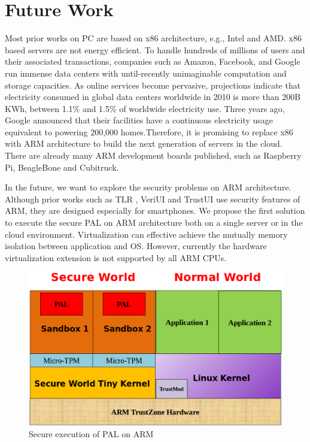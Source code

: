 \section{Future Work}
\label{sec:future}

Most prior works on PC are based on x86 architecture, e.g., Intel and AMD. x86
based servers are not energy efficient. To handle hundreds of millions of users
and their associated transactions, companies such as Amazon, Facebook, and
Google run immense data centers with until-recently unimaginable computation and
storage capacities. As online services become pervasive, projections indicate
that electricity consumed in global data centers worldwide in 2010 is more than
200B KWh, between 1.1\% and 1.5\% of worldwide electricity use. Three years ago,
Google announced that their facilities have a continuous electricity usage
equivalent to powering 200,000 homes.Therefore, it is promising to replace x86
with ARM architecture to build the next generation of servers in the cloud.
There are already many ARM development boards published, such as Raspberry Pi,
BeagleBone and Cubitruck. 

In the future, we want to explore the security problems on ARM architecture.
Although prior works such as TLR \cite{TLR}, VeriUI \cite{VeriUI} and TrustUI
\cite{TrustUI} use security features of ARM, they are designed especially for
smartphones. We propose the first solution to execute the secure PAL on ARM
architecture both on a single server or in the cloud environment. Virtualization
can effective achieve the mutually memory isolation between application and OS.
However, currently the hardware virtualization extension is not supported by all
ARM CPUs.

\begin{figure}[htb]
\centering
\includegraphics[width=\columnwidth]{figures/future.eps}
\caption{Secure execution of PAL on ARM}
\label{fig:future}
\end{figure}

